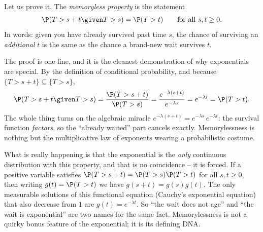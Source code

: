 Let us prove it. The \emph{memoryless property} is the statement
\[
  \P(T > s + t \given T > s) = \P(T > t)
  \qquad \text{for all } s, t \ge 0.
\]
In words: given you have already survived past time $s$, the chance of surviving
an \emph{additional} $t$ is the same as the chance a brand-new wait survives $t$.

\begin{whybox}
The proof is one line, and it is the cleanest demonstration of why
exponentials are special. By the definition of conditional probability, and
because $\{T > s+t\} \subseteq \{T > s\}$,
\[
  \P(T > s+t \given T > s)
   = \frac{\P(T > s+t)}{\P(T > s)}
   = \frac{e^{-\lambda(s+t)}}{e^{-\lambda s}}
   = e^{-\lambda t} = \P(T > t).
\]
The whole thing turns on the algebraic miracle $e^{-\lambda(s+t)} =
e^{-\lambda s}\,e^{-\lambda t}$: the survival function \emph{factors}, so the
``already waited'' part cancels exactly. Memorylessness is nothing but the
multiplicative law of exponents wearing a probabilistic costume.
\end{whybox}

\begin{happeningbox}
What is really happening is that the exponential is the \emph{only} continuous
distribution with this property, and that is no coincidence -- it is forced. If
a positive variable satisfies $\P(T>s+t) = \P(T>s)\P(T>t)$ for all $s,t\ge0$,
then writing $g(t) = \P(T>t)$ we have $g(s+t)=g(s)g(t)$. The only measurable
solutions of this functional equation (Cauchy's exponential equation) that also
decrease from $1$ are $g(t) = e^{-\lambda t}$. So ``the wait does not age'' and
``the wait is exponential'' are two names for the same fact. Memorylessness is
not a quirky bonus feature of the exponential; it is its defining DNA.
\end{happeningbox}

